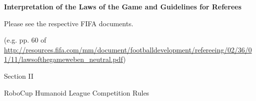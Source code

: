 \documentclass[a4paper]{article}
\begin{document}


\clearpage























\bigskip


\bigskip

\clearpage
{\Huge{\bfseries
Interpretation of the Laws of the Game and Guidelines for Referees}

\vspace*{1.5cm}

{\Large
Please see the respective FIFA documents.}}

{\scriptsize 	
(e.g. pp. 60 of
\url{http://resources.fifa.com/mm/document/footballdevelopment/refereeing/02/36/01/11/lawsofthegameweben_neutral.pdf})}




\clearpage

\begin{center}
\Huge\bfseries{
\vspace*{3cm}
Section II

\vspace*{2cm}

 RoboCup Humanoid League Competition Rules}
\end{center}



\end{document}
